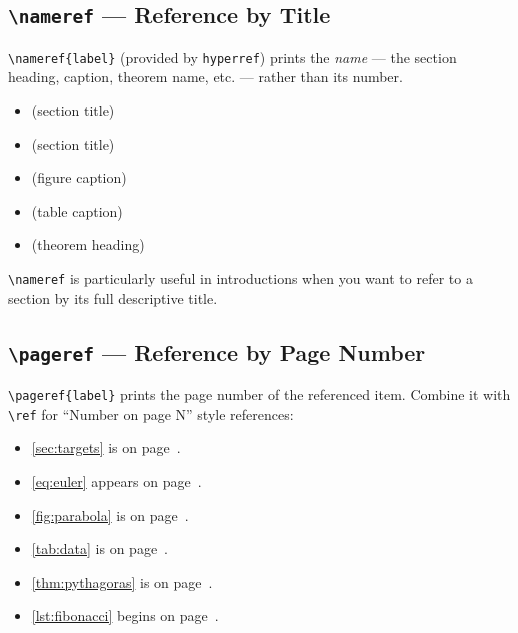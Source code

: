\documentclass[12pt,a4paper]{article}
\begin{document}
\subsection{\texttt{\textbackslash nameref} — Reference by Title}
\label{subsec:nameref}

\verb|\nameref{label}| (provided by \texttt{hyperref}) prints the
\emph{name} — the section heading, caption, theorem name, etc. — rather
than its number.

\begin{itemize}
    \item {} (section title)
    \item {} (section title)
    \item {} (figure caption)
    \item {} (table caption)
    \item {} (theorem heading)
\end{itemize}

\noindent\verb|\nameref| is particularly useful in introductions when you
want to refer to a section by its full descriptive title.

\subsection{\texttt{\textbackslash pageref} — Reference by Page Number}
\label{subsec:pageref}

\verb|\pageref{label}| prints the page number of the referenced item.
Combine it with \verb|\ref| for ``Number on page N'' style references:

\begin{itemize}
    \item \cref{sec:targets} is on page~\pageref{sec:targets}.
    \item \cref{eq:euler} appears on page~\pageref{eq:euler}.
    \item \cref{fig:parabola} is on page~\pageref{fig:parabola}.
    \item \cref{tab:data} is on page~\pageref{tab:data}.
    \item \cref{thm:pythagoras} is on page~\pageref{thm:pythagoras}.
    \item \cref{lst:fibonacci} begins on page~\pageref{lst:fibonacci}.
\end{itemize}

\end{document}
